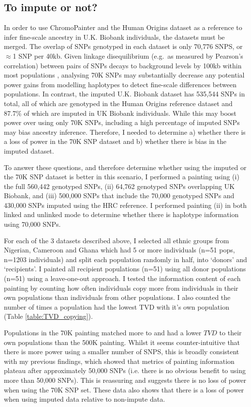 \subsection{To impute or not?}

In order to use ChromoPainter and the Human Origins dataset as a reference to infer fine-scale ancestry in U.K. Biobank individuals, the datasets must be merged. The overlap of SNPs genotyped in each dataset is only 70,776 SNPS, or $\approx$1 SNP per 40kb. Given linkage disequilibrium (e.g.\ as measured by Pearson's correlation) between pairs of SNPs decays to background levels by 100kb within most populations \cite{bosch2009decay}, analysing 70K SNPs may substantially decrease any potential power gains from modelling haplotypes to detect fine-scale differences between populations. In contrast, the imputed U.K. Biobank dataset has 535,544 SNPs in total, all of which are genotyped in the Human Origins reference dataset and 87.7\% of which are imputed in UK Biobank individuals. While this may boost power over using only 70K SNPs, including a high percentage of imputed SNPs may bias ancestry inference. Therefore, I needed to determine a) whether there is a loss of power in the 70K SNP dataset and b) whether there is bias in the imputed dataset.

To answer these questions, and therefore determine whether using the imputed or the 70K SNP dataset is better in this scenario, I performed a painting using (i) the full 560,442 genotyped SNPs, (ii) 64,762 genotyped SNPs overlapping UK Biobank, and (iii) 500,000 SNPs that include the 70,000 genotyped SNPs and 430,000 SNPs imputed using the HRC reference. I performed painting (ii) in both linked and unlinked mode to determine whether there is haplotype information using 70,000 SNPs.

For each of the 3 datasets described above, I selected all ethnic groups from Nigerian, Cameroon and Ghana which had 5 or more individuals (n=51 pops, n=1203 individuals) and split each population randomly in half, into `donors' and `recipients'. I painted all recipient populations (n=51) using all donor populations (n=51) using a leave-one-out approach. I tested the information content of each painting by counting how often individuals copy more from 
individuals in their own populations than individuals from other populations. I also counted the number of times a population had the lowest TVD with it's own population (Table \ref{table:TVD_copying}).

Populations in the 70K painting matched more to and had a lower $TVD$ to their own populations than the 500K painting. Whilst it seems counter-intuitive that there is more power using a smaller number of SNPS, this is broadly consistent with my previous findings, which showed that metrics of painting information plateau after approximately 50,000 SNPs (i.e. there is no obvious benefit to using more than 50,000 SNPs). This is reassuring and suggests there is no loss of power when using the 70K SNP set. These data also shows that there is a loss of power when using imputed data relative to non-impute data.

